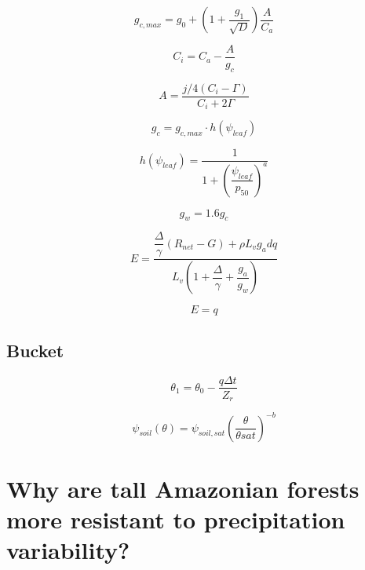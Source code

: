 \documentclass[11pt]{article}
\begin{document}
\begin{equation}
g_{c,max} = g_0 + \left(1+\dfrac{g_1}{\sqrt{D}}\right)\dfrac{A}{C_a}
\end{equation}

\begin{equation}
C_i = C_a - \dfrac{A}{g_c}
\end{equation}

\begin{equation}
A = \dfrac{j/4\left(C_i-\Gamma\right)}{C_i+2\Gamma}
\end{equation}

\begin{equation}
g_c = g_{c,max}\cdot h\left(\psi_{leaf}\right)
\end{equation}

\begin{equation}
h\left(\psi_{leaf}\right) = 
\dfrac{1}{
1+\left(\dfrac{\psi_{leaf}}{p_{50}}\right)^a
}
\end{equation}


\begin{equation}
g_w = 1.6g_c
\end{equation}

\begin{equation}
E = \dfrac{\dfrac{\Delta}{\gamma}\left(R_{net}-G\right)+\rho L_v g_a dq}
{L_v\left(1+\dfrac{\Delta}{\gamma}+\dfrac{g_a}{g_w}\right)}
\end{equation}

\begin{equation}
E = q
\end{equation}

\subsection{Bucket}

\begin{equation}
\theta_1 = \theta_0 - \dfrac{q\Delta t}{Z_r}
\end{equation}

\begin{equation}
\psi_{soil}\left(\theta\right) = \psi_{soil,sat}\left(\dfrac{\theta}{\theta{sat}}\right)^{-b}
\end{equation}


\newpage
\section{Why are tall Amazonian forests more resistant to precipitation variability?}
\end{document}
